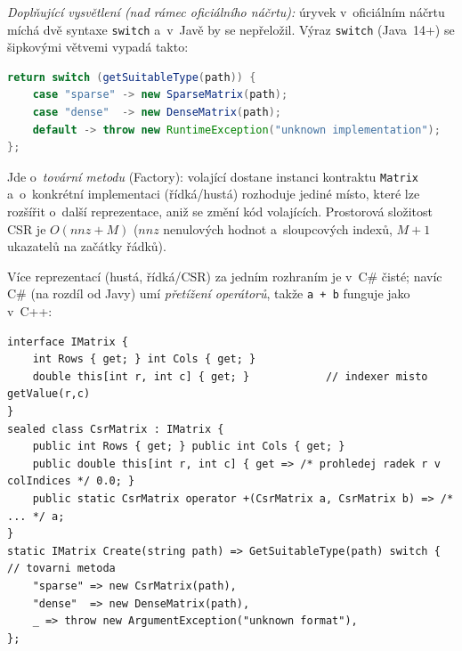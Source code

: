 \noindent\textit{Doplňující vysvětlení (nad rámec oficiálního náčrtu):} úryvek v~oficiálním náčrtu
míchá dvě syntaxe \texttt{switch} a~v~Javě by se nepřeložil. Výraz \texttt{switch} (Java~14+) se
šipkovými větvemi vypadá takto:
\begin{lstlisting}[language=Java]
return switch (getSuitableType(path)) {
    case "sparse" -> new SparseMatrix(path);
    case "dense"  -> new DenseMatrix(path);
    default -> throw new RuntimeException("unknown implementation");
};
\end{lstlisting}
Jde o~\emph{tovární metodu} (Factory): volající dostane instanci kontraktu \texttt{Matrix}
a~o~konkrétní implementaci (řídká/hustá) rozhoduje jediné místo, které lze rozšířit o~další
reprezentace, aniž se změní kód volajících. Prostorová složitost CSR je $O(\mathit{nnz} + M)$
($\mathit{nnz}$ nenulových hodnot a~sloupcových indexů, $M+1$ ukazatelů na začátky řádků).

\medskip
\begin{csalt}
Více reprezentací (hustá, řídká/CSR) za jedním rozhraním je v~C\# čisté; navíc C\# (na rozdíl
od Javy) umí \emph{přetížení operátorů}, takže \texttt{a + b} funguje jako v~C++:
\begin{lstlisting}[style=cs]
interface IMatrix {
    int Rows { get; } int Cols { get; }
    double this[int r, int c] { get; }            // indexer misto getValue(r,c)
}
sealed class CsrMatrix : IMatrix {
    public int Rows { get; } public int Cols { get; }
    public double this[int r, int c] { get => /* prohledej radek r v colIndices */ 0.0; }
    public static CsrMatrix operator +(CsrMatrix a, CsrMatrix b) => /* ... */ a;
}
static IMatrix Create(string path) => GetSuitableType(path) switch {   // tovarni metoda
    "sparse" => new CsrMatrix(path),
    "dense"  => new DenseMatrix(path),
    _ => throw new ArgumentException("unknown format"),
};
\end{lstlisting}
\end{csalt}
